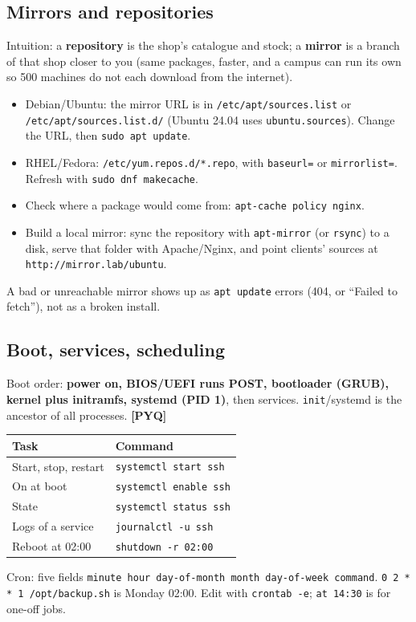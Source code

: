 \documentclass[11pt,a4paper]{article}
\newcommand{\pyq}{\textcolor{ember}{\scriptsize\textbf{[PYQ]}}}
\begin{document}
\subsection{Mirrors and repositories}
Intuition: a \textbf{repository} is the shop's catalogue and stock; a \textbf{mirror} is a branch of that shop closer to you (same packages, faster, and a campus can run its own so 500 machines do not each download from the internet).
\begin{itemize}
\item Debian/Ubuntu: the mirror URL is in \texttt{/etc/apt/sources.list} or \texttt{/etc/apt/sources.list.d/} (Ubuntu 24.04 uses \texttt{ubuntu.sources}). Change the URL, then \texttt{sudo apt update}.
\item RHEL/Fedora: \texttt{/etc/yum.repos.d/*.repo}, with \texttt{baseurl=} or \texttt{mirrorlist=}. Refresh with \texttt{sudo dnf makecache}.
\item Check where a package would come from: \texttt{apt-cache policy nginx}.
\item Build a local mirror: sync the repository with \texttt{apt-mirror} (or \texttt{rsync}) to a disk, serve that folder with Apache/Nginx, and point clients' sources at \texttt{http://mirror.lab/ubuntu}.
\end{itemize}
A bad or unreachable mirror shows up as \texttt{apt update} errors (404, or ``Failed to fetch''), not as a broken install.

\subsection{Boot, services, scheduling}
Boot order: \textbf{power on, BIOS/UEFI runs POST, bootloader (GRUB), kernel plus initramfs, systemd (PID 1)}, then services. \texttt{init}/systemd is the ancestor of all processes. \pyq{}

\begin{center}\small\renewcommand{\arraystretch}{1.18}\setlength{\tabcolsep}{9pt}
\begin{tabularx}{\linewidth}{@{}>{\raggedright\arraybackslash}X>{\raggedright\arraybackslash}X@{}}
\toprule
\textbf{\color{slate}Task} & \textbf{\color{slate}Command} \\ \midrule
Start, stop, restart & \texttt{systemctl start ssh} \\
On at boot & \texttt{systemctl enable ssh} \\
State & \texttt{systemctl status ssh} \\
Logs of a service & \texttt{journalctl -u ssh} \\
Reboot at 02:00 & \texttt{shutdown -r 02:00} \\
\bottomrule
\end{tabularx}\end{center}
Cron: five fields \texttt{minute hour day-of-month month day-of-week command}. \texttt{0 2 * * 1 /opt/backup.sh} is Monday 02:00. Edit with \texttt{crontab -e}; \texttt{at 14:30} is for one-off jobs.
\end{document}
